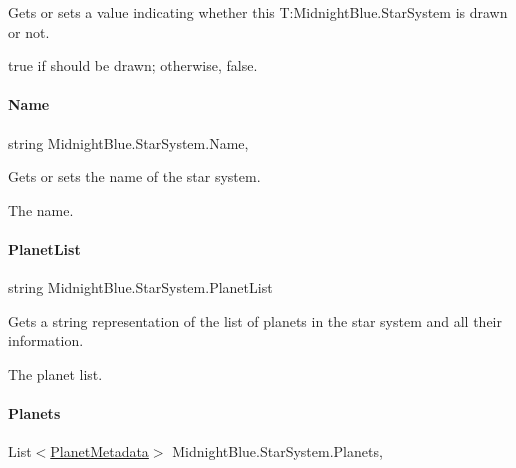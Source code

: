 Gets or sets a value indicating whether this T\+:\+Midnight\+Blue.\+Star\+System is drawn or not. 

{\ttfamily true} if should be drawn; otherwise, {\ttfamily false}.\hypertarget{class_midnight_blue_1_1_star_system_a63adfd0ef7d74bb7d5f224bb2df75aa5}{}\label{class_midnight_blue_1_1_star_system_a63adfd0ef7d74bb7d5f224bb2df75aa5} 
\paragraph{\texorpdfstring{Name}{Name}}
{\footnotesize\ttfamily string Midnight\+Blue.\+Star\+System.\+Name\hspace{0.3cm}{\ttfamily [get]}, {\ttfamily [set]}}



Gets or sets the name of the star system. 

The name.\hypertarget{class_midnight_blue_1_1_star_system_af74f3d59d7010d0d0a57549f7bbd2639}{}\label{class_midnight_blue_1_1_star_system_af74f3d59d7010d0d0a57549f7bbd2639} 
\paragraph{\texorpdfstring{Planet\+List}{PlanetList}}
{\footnotesize\ttfamily string Midnight\+Blue.\+Star\+System.\+Planet\+List\hspace{0.3cm}{\ttfamily [get]}}



Gets a string representation of the list of planets in the star system and all their information. 

The planet list.\hypertarget{class_midnight_blue_1_1_star_system_a041dfe27c393065732ea841516388c50}{}\label{class_midnight_blue_1_1_star_system_a041dfe27c393065732ea841516388c50} 
\paragraph{\texorpdfstring{Planets}{Planets}}
{\footnotesize\ttfamily List$<$\hyperlink{class_midnight_blue_1_1_planet_metadata}{Planet\+Metadata}$>$ Midnight\+Blue.\+Star\+System.\+Planets\hspace{0.3cm}{\ttfamily [get]}, {\ttfamily [set]}}



